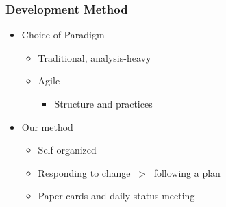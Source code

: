 \begin{frame}
    \frametitle{Development Method}
    \begin{itemize}
			\item Choice of Paradigm
		  \begin{itemize}
				\item Traditional, analysis-heavy
				\item Agile
				\begin{itemize}
					\item Structure and practices
				\end{itemize}
			\end{itemize}
			\item Our method
			\begin{itemize}
				\item Self-organized
				\item Responding to change \ > \ following a plan
				\item Paper cards and daily status meeting
			\end{itemize}
		\end{itemize}
\end{frame}
